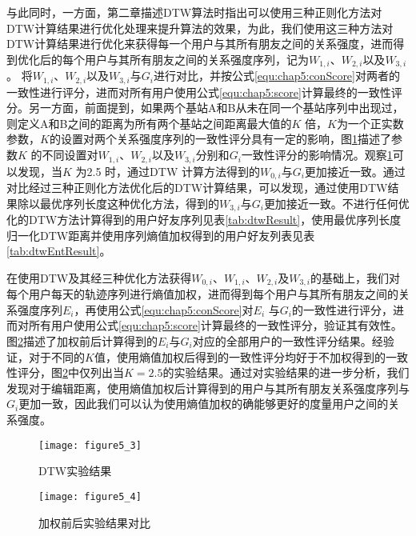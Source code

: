 与此同时，一方面，第二章描述DTW算法时指出可以使用三种正则化方法对DTW计算结果进行优化处理来提升算法的效果，为此，我们使用这三种方法对DTW计算结果进行优化来获得每一个用户与其所有朋友之间的关系强度，进而得到优化后的每个用户与其所有朋友之间的关系强度序列，记为$W_{1,i}$、$W_{2,i}$以及$W_{3,i}$。 将$W_{1,i}$、$W_{2,i}$以及$W_{3,i}$与$G_{i}$进行对比，并按公式\ref{equ:chap5:conScore}对两者的一致性进行评分，进而对所有用户使用公式\ref{equ:chap5:score}计算最终的一致性评分。另一方面，前面提到，如果两个基站A和B从未在同一个基站序列中出现过，则定义A和B之间的距离为所有两个基站之间距离最大值的$K$ 倍，$K$为一个正实数参数，$K$的设置对两个关系强度序列的一致性评分具有一定的影响，图\ref{fig:5_3}描述了参数$K$ 的不同设置对$W_{1,i}$、$W_{2,i}$以及$W_{3,i}$分别和$G_{i}$一致性评分的影响情况。观察\ref{fig:5_3}可以发现，当$K$ 为2.5 时，通过DTW 计算方法得到的$W_{0,i}$与$G_{i}$更加接近一致。通过对比经过三种正则化方法优化后的DTW计算结果，可以发现，通过使用DTW结果除以最优序列长度这种优化方法，得到的$W_{3,i}$与$G_{i}$更加接近一致。不进行任何优化的DTW方法计算得到的用户好友序列见表\ref{tab:dtwResult}，使用最优序列长度归一化DTW距离并使用序列熵值加权得到的用户好友列表见表\ref{tab:dtwEntResult}。
\par 在使用DTW及其经三种优化方法获得$W_{0,i}$、$W_{1,i}$、$W_{2,i}$及$W_{3,i}$的基础上，我们对每个用户每天的轨迹序列进行熵值加权，进而得到每个用户与其所有朋友之间的关系强度序列$E_{i}$，再使用公式\ref{equ:chap5:conScore}对$E_{i}$ 与$G_{i}$的一致性进行评分，进而对所有用户使用公式\ref{equ:chap5:score}计算最终的一致性评分，验证其有效性。图\ref{fig:5_4}描述了加权前后计算得到的$E_{i}$与$G_{i}$对应的全部用户的一致性评分结果。经验证，对于不同的$K$值，使用熵值加权后得到的一致性评分均好于不加权得到的一致性评分，图\ref{fig:5_4}中仅列出当$K=2.5$的实验结果。通过对实验结果的进一步分析，我们发现对于编辑距离，使用熵值加权后计算得到的用户与其所有朋友关系强度序列与$G_{i}$更加一致，因此我们可以认为使用熵值加权的确能够更好的度量用户之间的关系强度。
\begin{figure}[htp]
\centering
\texttt{[image: figure5\_3]}
\caption{DTW实验结果}
\label{fig:5_3}
\end{figure}
\begin{figure}[htp]
\centering
\texttt{[image: figure5\_4]}
\caption{加权前后实验结果对比}
\label{fig:5_4}
\end{figure}
